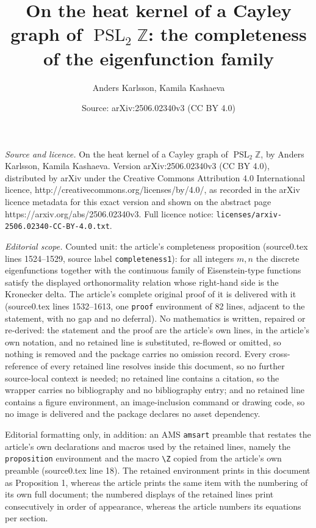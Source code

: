 \documentclass[10pt,a4paper]{amsart}
\title[completeness proposition]{On the heat kernel of a Cayley graph of $\operatorname{PSL}_2\mathbb{Z}$: the completeness of the eigenfunction family}
\author{Anders Karlsson, Kamila Kashaeva}
\date{Source: arXiv:2506.02340v3 (CC BY 4.0)}
\begin{document}
\maketitle

\noindent\emph{Source and licence.} On the heat kernel of a Cayley graph of $\operatorname{PSL}_2\mathbb{Z}$, by Anders Karlsson, Kamila Kashaeva. Version arXiv:2506.02340v3
(CC BY 4.0), distributed by arXiv under the Creative Commons Attribution 4.0 International licence,
http://creativecommons.org/licenses/by/4.0/, as recorded in the arXiv licence metadata for this exact
version and shown on the abstract page https://arxiv.org/abs/2506.02340v3. Full licence notice:
\texttt{licenses/arxiv-2506.02340-CC-BY-4.0.txt}.\par\smallskip

\noindent\textit{Editorial scope.} Counted unit: the article's completeness proposition (source0.tex lines 1524--1529, source label \texttt{completeness1}): for all integers $m,n$ the discrete eigenfunctions together with the continuous family of Eisenstein-type functions satisfy the displayed orthonormality relation whose right-hand side is the Kronecker delta. The article's complete original proof of it is delivered with it (source0.tex lines 1532--1613, one \texttt{proof} environment of 82 lines, adjacent to the statement, with no gap and no deferral). No mathematics is written, repaired or re-derived: the statement and the proof are the article's own lines, in the article's own notation, and no retained line is substituted, re-flowed or omitted, so nothing is removed and the package carries no omission record. Every cross-reference of every retained line resolves inside this document, so no further source-local context is needed; no retained line contains a citation, so the wrapper carries no bibliography and no bibliography entry; and no retained line contains a figure environment, an image-inclusion command or drawing code, so no image is delivered and the package declares no asset dependency.

Editorial formatting only, in addition: an AMS \texttt{amsart} preamble that restates the article's own declarations and macros used by the retained lines, namely the \texttt{proposition} environment and the macro \texttt{\textbackslash Z} copied from the article's own preamble (source0.tex line 18). The retained environment prints in this document as Proposition 1, whereas the article prints the same item with the numbering of its own full document; the numbered displays of the retained lines print consecutively in order of appearance, whereas the article numbers its equations per section.
\end{document}
